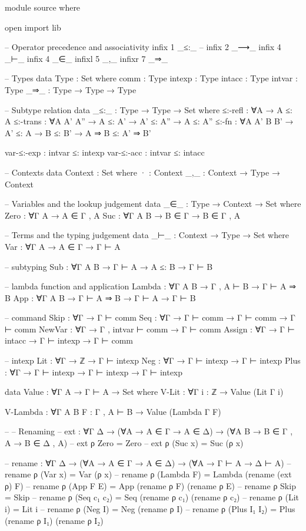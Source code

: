 \documentclass{article}
\begin{document}
\begin{prev}
\begin{code}
module source where

open import lib

-- Operator precedence and associativity
infix 1 _≤:_
-- infix 2 _⟶_ 
infix 4 _⊢_
infix 4 _∈_
infixl 5 _,_
infixr 7 _⇒_

-- Types
data Type : Set where
    comm : Type
    intexp : Type
    intacc : Type
    intvar : Type
    _⇒_ : Type → Type → Type

-- Subtype relation
data _≤:_ : Type → Type → Set where
    ≤:-refl : ∀{A} → A ≤: A
    ≤:-trans : ∀{A A' A''} → A ≤: A' → A' ≤: A'' → A ≤: A''
    ≤:-fn : ∀{A A' B B'} → A' ≤: A → B ≤: B' → A ⇒ B ≤: A' ⇒ B'

    var-≤:-exp : intvar ≤: intexp
    var-≤:-acc : intvar ≤: intacc

-- Contexts
data Context : Set where
    · : Context
    _,_ : Context → Type → Context

-- Variables and the lookup judgement
data _∈_ : Type → Context → Set where
    Zero : ∀{Γ A} → A ∈ Γ , A
    Suc : ∀{Γ A B} → B ∈ Γ → B ∈ Γ , A

-- Terms and the typing judgement
data _⊢_ : Context → Type → Set where
    Var : ∀{Γ A} → A ∈ Γ → Γ ⊢ A

    -- subtyping
    Sub : ∀{Γ A B} → Γ ⊢ A → A ≤: B → Γ ⊢ B

    -- lambda function and application
    Lambda : ∀{Γ A B} → Γ , A ⊢ B → Γ ⊢ A ⇒ B
    App : ∀{Γ A B} → Γ ⊢ A ⇒ B → Γ ⊢ A → Γ ⊢ B

    -- command
    Skip : ∀{Γ} → Γ ⊢ comm
    Seq : ∀{Γ} → Γ ⊢ comm → Γ ⊢ comm → Γ ⊢ comm
    NewVar : ∀{Γ} → Γ , intvar ⊢ comm → Γ ⊢ comm
    Assign : ∀{Γ} → Γ ⊢ intacc → Γ ⊢ intexp → Γ ⊢ comm

    -- intexp
    Lit : ∀{Γ} → ℤ → Γ ⊢ intexp
    Neg : ∀{Γ} → Γ ⊢ intexp → Γ ⊢ intexp
    Plus : ∀{Γ} → Γ ⊢ intexp → Γ ⊢ intexp → Γ ⊢ intexp


data Value : ∀{Γ A} → Γ ⊢ A → Set where
    V-Lit : ∀{Γ} {i : ℤ} → Value (Lit {Γ} i)

    V-Lambda : ∀{Γ A B} {F : Γ , A ⊢ B} → Value (Lambda {Γ} F)

-- -- Renaming
-- ext : ∀{Γ Δ} → (∀{A} → A ∈ Γ → A ∈ Δ) → (∀{A B} → B ∈ Γ , A → B ∈ Δ , A)
-- ext ρ Zero = Zero
-- ext ρ (Suc x) = Suc (ρ x)

-- rename : ∀{Γ Δ} → (∀{A} → A ∈ Γ → A ∈ Δ) → (∀{A} → Γ ⊢ A → Δ ⊢ A)
-- rename ρ (Var x) = Var (ρ x)
-- rename ρ (Lambda F) = Lambda (rename (ext ρ) F)
-- rename ρ (App F E) = App (rename ρ F) (rename ρ E)
-- rename ρ Skip = Skip
-- rename ρ (Seq c₁ c₂) = Seq (rename ρ c₁) (rename ρ c₂)
-- rename ρ (Lit i) = Lit i
-- rename ρ (Neg I) = Neg (rename ρ I)
-- rename ρ (Plus I₁ I₂) = Plus (rename ρ I₁) (rename ρ I₂)


\end{code}
\end{prev}
\end{document}
